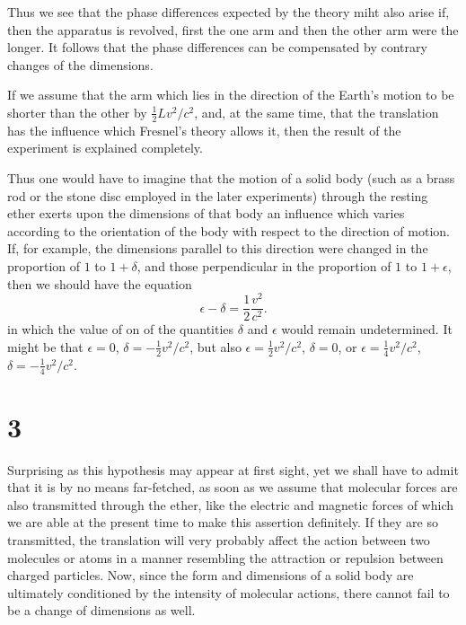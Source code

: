 Thus we see that the phase differences expected by the theory miht also arise if, then the apparatus is revolved, first the one arm and then the other arm were the longer. It follows that the phase differences can be compensated by contrary changes of the dimensions.

If we assume that the arm which lies in the direction of the Earth's motion to be shorter than the other by $\frac{1}{2}Lv^2/c^2$, and, at the same time, that the translation has the influence which Fresnel's theory allows it, then the result of the experiment is explained completely.

Thus one would have to imagine that the motion of a solid body (such as a brass rod or the stone disc employed in the later experiments) through the resting ether exerts upon the dimensions of that body an influence which varies according to the orientation of the body with respect to the direction of motion. If, for example, the dimensions parallel to this direction were changed in the proportion of $1$ to $1+\delta$, and those perpendicular in the proportion of $1$ to $1+\epsilon$, then we should have the equation
\begin{equation}
    \epsilon - \delta = \frac{1}{2}\frac{v^2}{c^2}.
    \label{eq:MIEeq1}
\end{equation}
in which the value of on of the quantities $\delta$ and $\epsilon$ would remain undetermined. It might be that $\epsilon = 0$, $\delta = -\frac{1}{2}v^2/c^2$, but also $\epsilon = \frac{1}{2}v^2/c^2$, $\delta = 0$, or $\epsilon = \frac{1}{4}v^2/c^2$, $\delta = -\frac{1}{4}v^2/c^2$.

\section*{3}
Surprising as this hypothesis may appear at first sight, yet we shall have to admit that it is by no means far-fetched, as soon as we assume that molecular forces are also transmitted through the ether, like the electric and magnetic forces of which we are able at the present time to make this assertion definitely. If they are so transmitted, the translation will very probably affect the action between two molecules or atoms in a manner resembling the attraction or repulsion between charged particles. Now, since the form and dimensions of a solid body are ultimately conditioned by the intensity of molecular actions, there cannot fail to be a change of dimensions as well.

